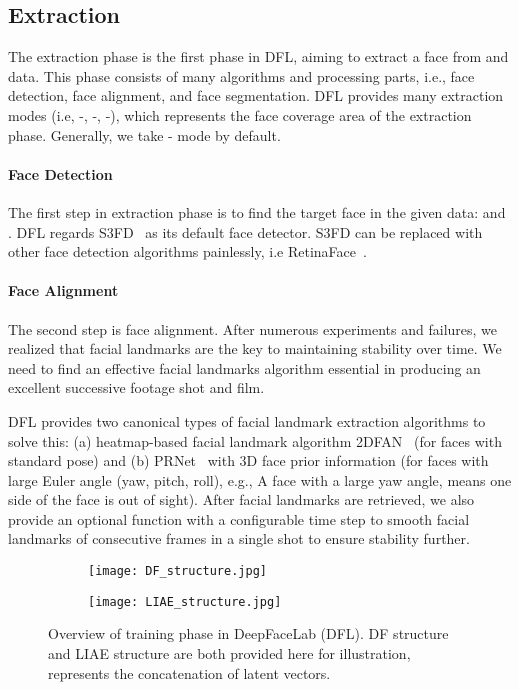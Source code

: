 \documentclass[10pt,twocolumn,letterpaper]{article}
\begin{document}
\subsection{Extraction}

The extraction phase is the first phase in DFL, aiming to extract a face from  and  data. This phase consists of many algorithms and processing parts, i.e., face detection, face alignment, and face segmentation. DFL provides many extraction modes (i.e, -, -, -), which represents the face coverage area of the extraction phase. Generally, we take - mode by default.



\paragraph{Face Detection} The first step in extraction phase is to find the target face in the given data:  and . DFL regards S3FD~\cite{zhang2017s3fd} as its default face detector. S3FD can be replaced with other face detection algorithms painlessly, i.e RetinaFace~\cite{deng2019retinaface}.



\paragraph{Face Alignment} The second step is face alignment. 
After numerous experiments and failures, we realized that facial landmarks are the key to maintaining stability over time. We need to find an effective facial landmarks algorithm essential in producing an excellent successive footage shot and film.

DFL provides two canonical types of facial landmark extraction algorithms to solve this: (a) heatmap-based facial landmark algorithm 2DFAN~\cite{bulat2017far} (for faces with standard pose) and (b) PRNet~\cite{feng2018joint} with 3D face prior information (for faces with large Euler angle (yaw, pitch, roll), e.g., A face with a large yaw angle, means one side of the face is out of sight). 
After facial landmarks are retrieved, we also provide an optional function with a configurable time step to smooth facial landmarks of consecutive frames in a single shot to ensure stability further.
\begin{figure*}[h]
	\centering 
	[DF Structure] 
	\begin{subfigure}
	    \centering
	    
		\texttt{[image: DF\_structure.jpg]}
	\end{subfigure}

    \begin{subfigure}
		\texttt{[image: LIAE\_structure.jpg]}
	\end{subfigure}
	\caption{Overview of training phase in DeepFaceLab (DFL). DF structure and LIAE structure are both provided here for illustration,  represents the concatenation of latent vectors.}
	\label{fig:long3}
	\label{fig:onecol3}
\end{figure*}
\end{document}
